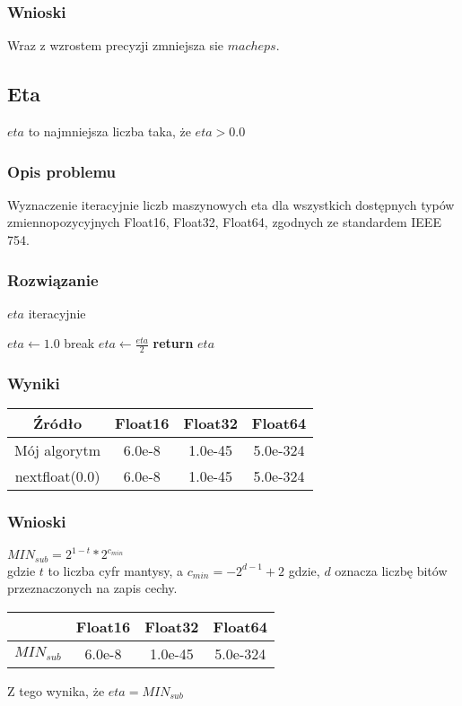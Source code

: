 \documentclass{article}
\begin{document}
\subsubsection{Wnioski}
    Wraz z wzrostem precyzji zmniejsza sie $macheps$.

\subsection{Eta}
	$eta$ to najmniejsza liczba taka, że $eta > 0.0$
\subsubsection{Opis problemu}
    Wyznaczenie iteracyjnie liczb maszynowych eta dla wszystkich dostępnych typów zmiennopozycyjnych Float16, Float32, Float64, zgodnych ze standardem IEEE 754.
\subsubsection{Rozwiązanie}
    \begin{algorithm}
    \caption{$eta$ iteracyjnie}\label{alg:cap}
    \begin{algorithmic}
        \State $eta \gets 1.0$
            	\State break
            \EndIf
            \State $eta \gets \frac{eta}{2}$
        \EndFor
        \State \textbf{return} $eta$
    \end{algorithmic}
    \end{algorithm}
\subsubsection{Wyniki}
    \begin{center}
        \begin{tabular}{|c||c|c|c|}
        \hline
            Źródło & Float16 & Float32 & Float64\\
            \hline\hline
            Mój algorytm & 6.0e-8 & 1.0e-45 & 5.0e-324\\
            \hline
            nextfloat(0.0) & 6.0e-8 & 1.0e-45 & 5.0e-324\\
        \hline
        \end{tabular}
    \end{center}
\subsubsection{Wnioski}
    $MIN_{sub} = 2^{1-t}*2^{c_{min}}$\\
    gdzie $t$ to liczba cyfr mantysy, a $c_{min}=-2^{d-1}+2$ gdzie, $d$ oznacza liczbę bitów przeznaczonych na zapis cechy.
        \begin{center}
        \begin{tabular}{|c|c|c|c|}
        \hline
             & Float16 & Float32 & Float64 \\
            \hline
            $MIN_{sub}$ & 6.0e-8 & 1.0e-45 & 5.0e-324\\
        \hline
        \end{tabular}
    \end{center}
    Z tego wynika, że $eta = MIN_{sub}$
\end{document}
